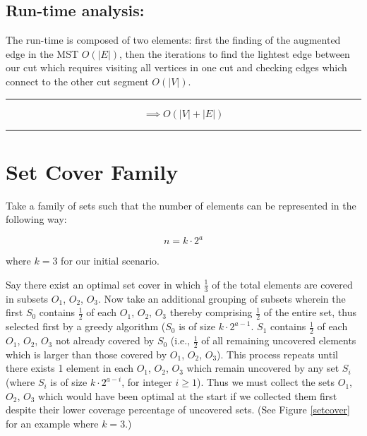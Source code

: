 \documentclass[conference]{styles/acmsiggraph}
\newcommand{\?}{\stackrel{?}{=}}
\begin{document}
\subsection{Run-time analysis:}
The run-time is composed of two elements:  first the finding of the augmented edge in the MST $O(|E|)$, then the iterations to find the lightest edge between our cut which requires visiting all vertices in one cut and checking edges which connect to the other cut segment $O(|V|)$. \\
\rule{\textwidth}{0.4pt}
$$\implies O(|V| + |E|)$$
\rule{\textwidth}{0.4pt}
























\newpage


\section{Set Cover Family}
Take a family of sets such that the number of elements can be represented in the following way:

$$n = k\cdot 2^a$$

where $k=3$ for our initial scenario.

Say there exist an optimal set cover in which $\frac{1}{3}$ of the total elements are covered in subsets $O_1$, $O_2$, $O_3$.  Now take an additional grouping of subsets wherein the first $S_0$ contains $\frac{1}{2}$ of each $O_1$, $O_2$, $O_3$ thereby comprising $\frac{1}{2}$ of the entire set, thus selected first by a greedy algorithm ($S_0$ is of size $k\cdot 2^{a-1}$.  $S_1$ contains $\frac{1}{2}$ of each $O_1$, $O_2$, $O_3$ not already covered by $S_0$ (i.e., $\frac{1}{2}$ of all remaining uncovered elements which is larger than those covered by $O_1$, $O_2$, $O_3$).  This process repeats until there exists 1 element in each $O_1$, $O_2$, $O_3$ which remain uncovered by any set $S_i$ (where $S_i$ is of size $k\cdot 2^{a-i}$, for integer $i \geq 1$).  Thus we must collect the sets $O_1$, $O_2$, $O_3$ which would have been optimal at the start if we collected them first despite their lower coverage percentage of uncovered sets. (See Figure \ref{setcover} for an example where $k=3$.)\\
\end{document}
